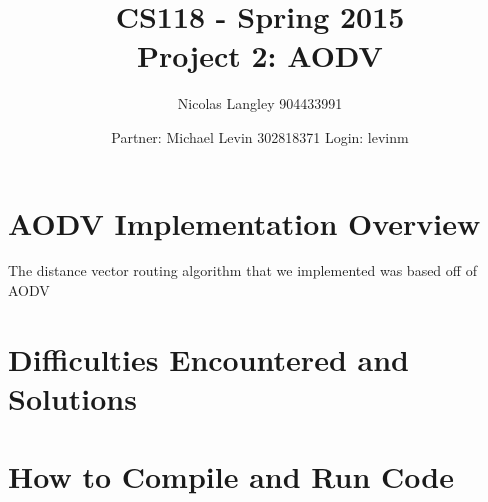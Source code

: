 \documentclass[12pt, titlepage]{article}
\begin{document}
\title{CS118 - Spring 2015 \\
Project 2: AODV}
\author{Nicolas Langley 904433991 \and Partner: Michael Levin 302818371 Login: levinm}

\maketitle
\section{AODV Implementation Overview}

The distance vector routing algorithm that we implemented was based off of AODV


\section{Difficulties Encountered and Solutions}



\section{How to Compile and Run Code}
\end{document}
